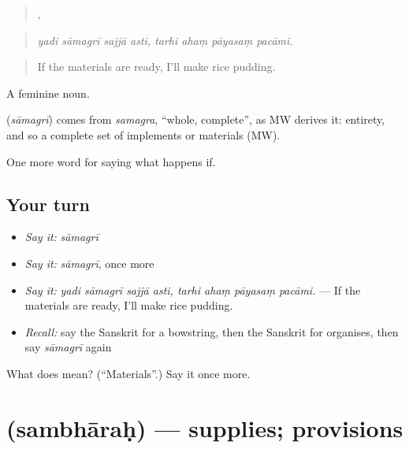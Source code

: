 \begin{quote}
   ,    
\end{quote}

\begin{quote}
\emph{yadi sāmagrī sajjā asti, tarhi ahaṃ pāyasaṃ pacāmi.}
\end{quote}

\begin{quote}
If the materials are ready, I'll make rice pudding.
\end{quote}

A feminine noun.

\begin{cousinweb}
\textbf{} (\emph{sāmagrī}) comes from \emph{samagra}, \textquotedblleft{}whole, complete\textquotedblright{}, as MW derives it: entirety, and so a complete set of implements or materials (MW).
\end{cousinweb}

\begin{grammarlens}[title={What you've built}]
One more word for saying what happens if.
\end{grammarlens}

\subsection*{Your turn}
\begin{itemize}
\raggedright
  \item \emph{Say it:} \emph{sāmagrī}
  \item \emph{Say it:} \emph{sāmagrī}, once more
  \item \emph{Say it:} \emph{yadi sāmagrī sajjā asti, tarhi ahaṃ pāyasaṃ pacāmi.} — If the materials are ready, I'll make rice pudding.
  \item \emph{Recall:} say the Sanskrit for a bowstring, then the Sanskrit for organises, then say \emph{sāmagrī} again
\end{itemize}

\begin{tcolorbox}[breakable,colback=teal!4,colframe=teal!35!black,title={Before you move on}]
What does  mean? (\textquotedblleft{}Materials\textquotedblright{}.) Say it once more.
\end{tcolorbox}
\section[\texorpdfstring{\sk{सम्भारः} (sambhāraḥ)}{सम्भारः (sambhāraḥ)}]{ (sambhāraḥ) — supplies; provisions}

